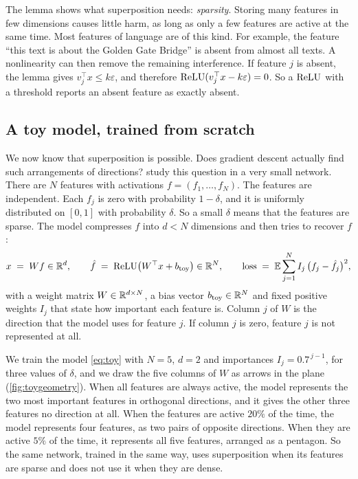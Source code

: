 The lemma shows what superposition needs: \emph{sparsity}. Storing many features in few dimensions causes little
harm, as long as only a few features are active at the same time. Most features of language are of this kind. For
example, the feature ``this text is about the Golden Gate Bridge'' is absent from almost all texts. A nonlinearity
can then remove the remaining interference. If feature $j$ is absent, the lemma gives $v_j^\top x\le k\varepsilon$,
and therefore $\mathrm{ReLU}(v_j^\top x-k\varepsilon)=0$. So a $\mathrm{ReLU}$ with a threshold reports an absent feature as
exactly absent.

\subsection{A toy model, trained from scratch}
\label{sec:toy}

We now know that superposition is possible. Does gradient descent actually find such arrangements of directions?
\citet{elhage2022toy} study this question in a very small network. There are $N$ features with activations
$f=(f_1,\dots,f_N)$. The features are independent. Each $f_j$ is zero with probability $1-\delta$, and it is
uniformly distributed on $[0,1]$ with probability $\delta$. So a small $\delta$ means that the features are sparse.
The model compresses $f$ into $d<N$ dimensions and then tries to recover $f$:
\begin{equation}\label{eq:toy}
x \;=\; Wf\in\mathbb{R}^d,\qquad \hat f \;=\; \mathrm{ReLU}\big(W^\top x+b_{\mathrm{toy}}\big)\in\mathbb{R}^N,\qquad
\text{loss} \;=\; \mathbb{E}\sum_{j=1}^{N}I_j\,\big(f_j-\hat f_j\big)^2 ,
\end{equation}
with a weight matrix $W\in\mathbb{R}^{d\times N}$, a bias vector $b_{\mathrm{toy}}\in\mathbb{R}^N$ and fixed positive weights
$I_j$ that state how important each feature is. Column $j$ of $W$ is the direction that the model uses for feature
$j$. If column $j$ is zero, feature $j$ is not represented at all.

\begin{experiment}\label{exp:pentagon} 
We train the model \eqref{eq:toy} with $N=5$, $d=2$ and importances $I_j=0.7^{\,j-1}$, for three values of
$\delta$, and we draw the five columns of $W$ as arrows in the plane (\cref{fig:toygeometry}). When all features are
always active, the model represents the two most important features in orthogonal directions, and it gives the
other three features no direction at all. When the features are active $20\%$ of the time, the model represents
four features, as two pairs of opposite directions. When they are active $5\%$ of the time, it represents all five
features, arranged as a pentagon. So the same network, trained in the same way, uses superposition when its
features are sparse and does not use it when they are dense.
\end{experiment}


